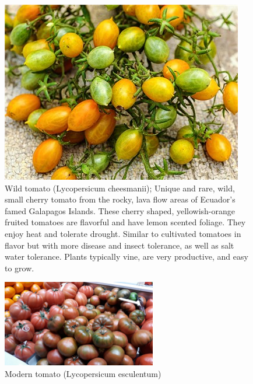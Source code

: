 \documentclass[11pt,ignorenonframetext,aspectratio=169]{beamer}
\begin{document}
\begin{frame}{}
\protect\hypertarget{section-7}{}
\begin{figure}
\includegraphics[width=0.45\linewidth,height=0.4\textheight]{./images/Tomato_galapagos_Solanum-cheesmanii} \caption{Wild tomato (Lycopersicum cheesmanii); Unique and rare, wild, small cherry tomato from the rocky, lava flow areas of Ecuador's famed Galapagos Islands. These cherry shaped, yellowish-orange fruited tomatoes are flavorful and have lemon scented foliage. They enjoy heat and tolerate drought. Similar to cultivated tomatoes in flavor but with more disease and insect tolerance, as well as salt water tolerance. Plants typically vine, are very productive, and easy to grow.}\label{fig:tomato-wild}
\end{figure}

\begin{figure}
\includegraphics[width=0.6\textwidth, keepaspectratio,height=0.4\textheight]{./images/modified_tomatoes} \caption{Modern tomato (Lycopersicum esculentum)}\label{fig:tomato-modern}
\end{figure}
\end{frame}
\end{document}
